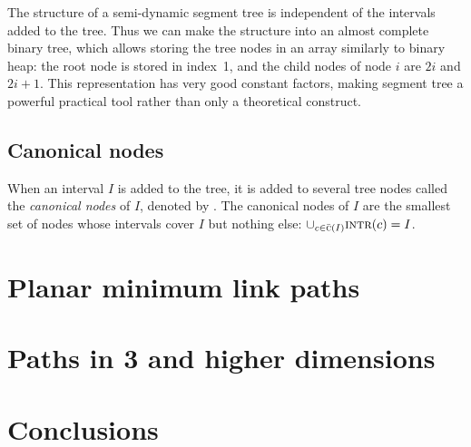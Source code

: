 \documentclass[english,gradu]{tktltiki2018}
\begin{document}
The structure of a semi-dynamic segment tree is independent of the intervals added to the tree.
Thus we can make the structure into an almost complete binary tree, which allows storing the tree nodes in an array similarly to binary heap:
the root node is stored in index~1, and the child nodes of node $i$ are $2i$ and $2i+1$.
This representation has very good constant factors, making segment tree a powerful practical tool rather than only a theoretical construct.

\subsection{Canonical nodes}

When an interval $I$ is added to the tree, it is added to several tree nodes called the \emph{canonical nodes} of $I$, denoted by .
The canonical nodes of $I$ are the smallest set of nodes whose intervals cover $I$ but nothing else: $\cup_{c\in\bar{\textsc{c}}(I)} \textsc{intr}(c)=I$.

\section{Planar minimum link paths}\label{sec:minlink2d}

\section{Paths in 3 and higher dimensions}\label{sec:minlink3d}

\section{Conclusions}\label{sec:conclusions}


\nocite{*}



\lastpage

\appendices

\pagestyle{empty}

\end{document}
